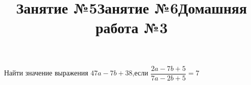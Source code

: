 %
\newpage
\title{Занятие №5}
\begin{listofex}
	\item {}
	\item {}
	\item {}
	\item {}
	\item {}
	\item {}
	\item {}
	\item {}
\end{listofex}
\newpage
\title{Занятие №6}
\begin{listofex}
	\item {}
	\item {}
	\item {}
	\item {}
	\item {}
	\item {}
	\item Найти значение выражения \( 47a-7b+38 \),\quad если \( \dfrac{2a-7b+5}{7a-2b+5}=7 \)
\end{listofex}
\newpage
\title{Домашняя работа №3}
\begin{listofex}
	\item {}
	\item {}
	\item {}
	\item {}
\end{listofex}
%
%
